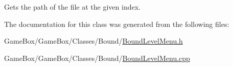 \-Gets the path of the file at the given index. 



\-The documentation for this class was generated from the following files\-:\begin{DoxyCompactItemize}
\item 
\-Game\-Box/\-Game\-Box/\-Classes/\-Bound/\hyperlink{_bound_level_menu_8h}{\-Bound\-Level\-Menu.\-h}\item 
\-Game\-Box/\-Game\-Box/\-Classes/\-Bound/\hyperlink{_bound_level_menu_8cpp}{\-Bound\-Level\-Menu.\-cpp}\end{DoxyCompactItemize}

